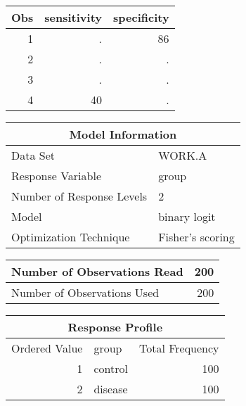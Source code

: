 \documentclass[10pt]{article}
\begin{document}
\pagebreak



\begin{longtable}{|r|r|r|}\hline
   Obs &    sensitivity &    specificity\\\hline
\endhead
   1 &    . &    86\\\hline
   2 &    . &    .\\\hline
   3 &    . &    .\\\hline
   4 &    40 &    .\\\hline
\end{longtable}


\pagebreak



\begin{longtable}{|l|l|}\hline
   \multicolumn{2}{|c|}{Model Information}\\\hline
\endhead
   Data Set &    WORK.A\\\hline
   Response Variable &    group\\\hline
   Number of Response Levels &    2\\\hline
   Model &    binary logit\\\hline
   Optimization Technique &    Fisher's scoring\\\hline
\end{longtable}



\begin{longtable}{|l|r|}\hline
   Number of Observations Read &    200\\\hline
   Number of Observations Used &    200\\\hline
\end{longtable}



\begin{longtable}{|r|l|r|}\hline
   \multicolumn{3}{|c|}{Response Profile}\\\hline
   Ordered {\newline} Value &    group &    Total {\newline} Frequency\\\hline
\endhead
   1 &    control &    100\\\hline
   2 &    disease &    100\\\hline
\end{longtable}
\end{document}
